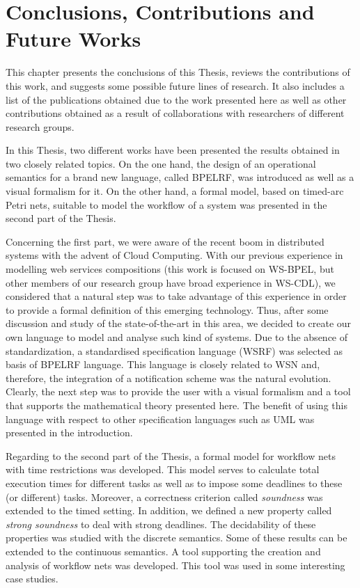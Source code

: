 \chapter{Conclusions, Contributions and Future Works}\label{chapter:c6}

This chapter presents the conclusions of this Thesis, reviews the contributions of this work, and suggests some possible future lines of research. It also includes a list of the publications obtained due to the work presented here as well as other contributions obtained as a result of collaborations with researchers of different research groups.

In this Thesis, two different works have been presented the results obtained in two closely related topics. On the one hand, the design of an operational semantics
for a brand new language, called BPELRF, was introduced as well as a visual formalism for it. On the other hand, a formal model, based on timed-arc Petri nets, suitable to model the workflow of a system was presented in the second part of the Thesis.  


Concerning the first part, we were aware of the recent boom in distributed systems with the advent of Cloud Computing. With our previous experience in modelling web services compositions (this work is focused on WS-BPEL, but other members of our research group have broad experience in WS-CDL), we considered that a natural step was to take advantage of this experience in order to provide a formal definition of this emerging technology. Thus, after some discussion and study of the state-of-the-art in this area, we decided to create our own language to model and analyse such kind of systems. Due to the absence of standardization, a standardised specification language (WSRF) was selected as basis of BPELRF language. This language is closely related to WSN and, therefore, the integration of a notification scheme was the natural evolution. Clearly, the next step was to provide the user with a visual formalism and a tool that supports the mathematical theory presented here. The benefit of using this language with respect to other specification languages such as UML was presented in the introduction.

Regarding to the second part of the Thesis, a formal model for workflow nets with time restrictions was developed. This model serves to calculate total execution times for different tasks as well as to impose some deadlines to these (or different) tasks. Moreover, a correctness criterion called \emph{soundness} was extended to the timed setting. In addition, we defined a new property called \emph{strong soundness} to deal with strong deadlines. The decidability of these properties was
studied with the discrete semantics. Some of these results can be extended to the continuous semantics. A tool supporting the creation and analysis of workflow nets
was developed. This tool was used in some interesting case studies. 

